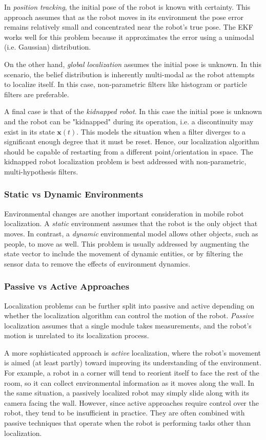 \documentclass[twoside]{article}
\begin{document}
    In \textit{position tracking}, the initial pose of the robot is known with certainty. This approach assumes that as the robot moves in its environment the pose error remains relatively small and concentrated near the robot's true pose. The EKF works well for this problem because it approximates the error using a unimodal (i.e. Gaussian) distribution.
    
    On the other hand, \textit{global localization} assumes the initial pose is unknown. In this scenario, the belief distribution is inherently multi-modal as the robot attempts to localize itself. In this case, non-parametric filters like histogram or particle filters are preferable. 
    
    A final case is that of the \textit{kidnapped robot}. In this case the initial pose is unknown and the robot can be "kidnapped" during its operation, i.e. a discontinuity may exist in its state $\mathbf{x}(t)$. This models the situation when a filter diverges to a significant enough degree that it must be reset. Hence, our localization algorithm should be capable of restarting from a different point/orientation in space. The kidnapped robot localization problem is best addressed with non-parametric, multi-hypothesis filters.
    
    \subsubsection{Static vs Dynamic Environments}
    Environmental changes are another important consideration in mobile robot localization. A \textit{static} environment assumes that the robot is the only object that moves. In contrast, a \textit{dynamic} environmental model allows other objects, such as people, to move as well. This problem is usually addressed by augmenting the state vector to include the movement of dynamic entities, or by filtering the sensor data to remove the effects of environment dynamics.
    
    \subsubsection{Passive vs Active Approaches}
    Localization problems can be further split into passive and active depending on whether the localization algorithm can control the motion of the robot. \textit{Passive} localization assumes that a single module takes measurements, and the robot's motion is unrelated to its localization process. 
    
    A more sophisticated approach is \textit{active} localization, where the robot's movement is aimed (at least partly) toward improving its understanding of the environment. For example, a robot in a corner will tend to reorient itself to face the rest of the room, so it can collect environmental information as it moves along the wall. In the same situation, a passively localized robot may simply slide along with its camera facing the wall. However, since active approaches require control over the robot, they tend to be insufficient in practice. They are often combined with passive techniques that operate when the robot is performing tasks other than localization. 
    
\end{document}
